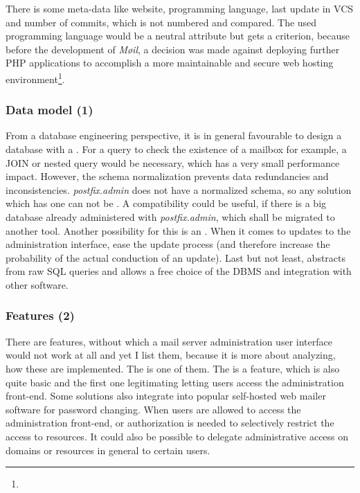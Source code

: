 \documentclass[12pt,a4paper]{scrartcl}
\begin{document}
			There is some meta-data like website, programming language, last
			update in VCS and number of commits, which is not numbered and
			compared. The used programming language would be a neutral
			attribute but gets a criterion, because before the development of
			\emph{Møil}, a decision was made against deploying further PHP
			applications to accomplish a more maintainable and secure web
			hosting environment\footnote{\urlPHPBashing}.


			\subsubsection*{Data model (1)}
				From a database engineering perspective, it is in general
				favourable to design a database with a  \cite{dbnorm}. For a query to
				check the existence of a mailbox for example, a JOIN or nested
				query would be necessary, which has a very small performance
				impact. However, the schema normalization prevents data
				redundancies and inconsistencies. \emph{postfix.admin} does not
				have a normalized schema, so any solution which has one can not
				be . A
				compatibility could be useful, if there is a big database
				already administered with \emph{postfix.admin}, which shall be
				migrated to another tool. Another possibility for this is an
				. When it comes
				to updates to the administration interface,  ease the update process
				(and therefore increase the probability of the actual
				conduction of an update). Last but not least,  abstracts from raw \ac{SQL} queries
				and allows a free choice of the \ac{DBMS} and integration with
				other software.

			\subsubsection*{Features (2)}
				There are features, without which a mail server administration
				user interface would not work at all and yet I list them,
				because it is more about analyzing, how these are implemented.
				The  is
				one of them. The  is a feature, which is also quite basic and the
				first one legitimating letting users access the administration
				front-end. Some solutions also integrate into popular
				self-hosted web mailer software for password changing. When
				users are allowed to access the administration front-end,
				 or authorization is needed to
				selectively restrict the access to resources. It could also be
				possible to delegate administrative access on domains or
				resources in general to certain users.
				\s
\end{document}
